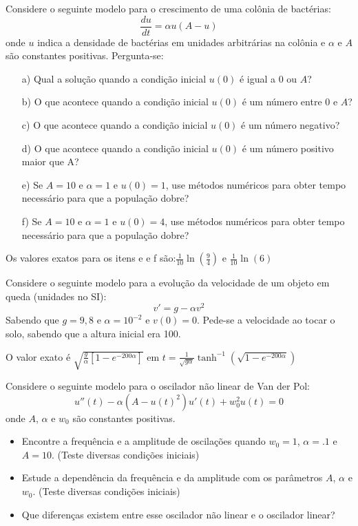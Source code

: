 \begin{exer} Considere o seguinte modelo para o crescimento de uma colônia de bactérias:
$$\frac{du}{dt}=\alpha u (A-u)$$
onde $u$ indica a densidade de bactérias em unidades arbitrárias na colônia e $\alpha$ e $A$ são constantes positivas.
Pergunta-se:
\begin{itemize}
\item[a)] Qual a solução quando a condição inicial $u(0)$ é igual a $0$ ou $A$?
\item[b)] O que acontece quando a condição inicial $u(0)$ é um número entre $0$ e $A$?
\item[c)] O que acontece quando a condição inicial $u(0)$ é um número negativo?
\item[d)] O que acontece quando a condição inicial $u(0)$ é um número positivo maior que A?
\item[e)] Se $A=10$ e $\alpha=1$ e $u(0)=1$, use métodos numéricos para obter tempo necessário para que a população dobre?
\item[f)] Se $A=10$ e $\alpha=1$ e $u(0)=4$, use métodos numéricos para obter tempo necessário para que a população dobre?
\end{itemize}
\end{exer}
\begin{resp}

Os valores exatos para os itens e e f são:$\frac{1}{10}\ln\left(\frac{9}{4}\right)$ e $\frac{1}{10}\ln\left(6\right)$

\end{resp}

\begin{exer} Considere o seguinte modelo para a evolução da velocidade de um objeto em queda (unidades no SI):
$$v'=g-\alpha v^2$$
Sabendo que $g=9,8$ e $\alpha=10^{-2}$ e $v(0)=0$. Pede-se a velocidade ao tocar o solo, sabendo que a altura inicial era 100.

\end{exer}
\begin{resp}

O valor exato é $\sqrt{\frac{g}{\alpha}\left[1-e^{{-200\alpha}}\right]}$ em $t=\frac{1}{\sqrt{g\alpha}}\tanh^{-1}\left(\sqrt{1-e^{{-200\alpha}}}\right)$

\end{resp}


\begin{exer} Considere o seguinte modelo para o oscilador não linear de Van der Pol:
$$u''(t) - \alpha (A-u(t)^2)u'(t) + w_0^2u(t)=0$$
onde $A$, $\alpha$ e $w_0$ são constantes positivas.
\begin{itemize}
\item Encontre a frequência e a amplitude de oscilações quando $w_0=1$, $\alpha=.1$ e $A=10$. (Teste diversas condições iniciais)
\item Estude a dependência da frequência e da amplitude com os parâmetros  $A$, $\alpha$ e $w_0$. (Teste diversas condições iniciais)
\item Que diferenças existem entre esse oscilador não linear e o oscilador linear?
\end{itemize}
\end{exer}

